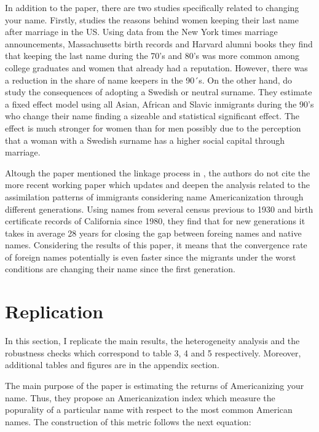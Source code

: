 \documentclass[12pt]{article}
\begin{document}
In addition to the paper, there are two studies specifically related to changing your name. Firstly, \cite{goldin2004making} studies the reasons behind women keeping their last name after marriage in the US. Using data from the New York times marriage announcements, Massachusetts birth records and Harvard alumni books they find that keeping the last name during the 70's and 80's was more common among college graduates and women that already had a reputation. However, there was a reduction in the share of name keepers in the 90´s. On the other hand, \cite{arai2009renouncing} do study the consequences of adopting a Swedish or neutral surname. They estimate a fixed effect model using all Asian, African and Slavic inmigrants during the 90's who change their name finding a sizeable and statistical significant effect. The effect is much stronger for women than for men possibly due to the perception that a woman with a Swedish surname has a higher social capital through marriage. 

\medskip

Altough the paper mentioned the linkage process in \cite{abramitzky2014nation}, the authors do not cite the more recent working paper \cite{abramitzky2016cultural} which updates and deepen the analysis related to the assimilation patterns of immigrants considering name Americanization through different generations. Using names from several census previous to 1930 and birth certificate records of California since 1980, they find that for new generations it takes in average 28 years for closing the gap between foreing names and native names. Considering the results of this paper, it means that the convergence rate of foreign names potentially is even faster since the migrants under the worst conditions are changing their name since the first generation. 

\section{Replication}

In this section, I replicate the main results, the heterogeneity analysis and the robustness checks which correspond to table 3, 4 and 5 respectively. Moreover, additional tables and figures are in the appendix section.

\medskip

 The main purpose of the paper is estimating the returns of Americanizing your name. Thus, they propose an Americanization index which measure the popurality of a particular name with respect to the most common American names. The construction of this metric follows the next equation:
\end{document}
